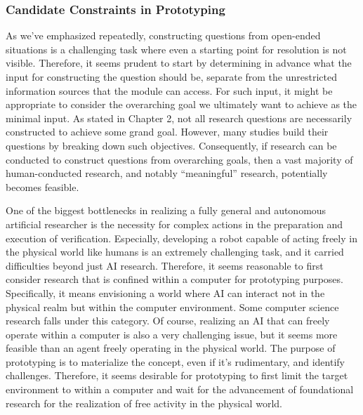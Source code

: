\subsubsection{Candidate Constraints in Prototyping}

As we've emphasized repeatedly, constructing questions from open-ended situations is a challenging task where even a starting point for resolution is not visible. Therefore, it seems prudent to start by determining in advance what the input for constructing the question should be, separate from the unrestricted information sources that the module can access. For such input, it might be appropriate to consider the overarching goal we ultimately want to achieve as the minimal input. As stated in Chapter 2, not all research questions are necessarily constructed to achieve some grand goal. However, many studies build their questions by breaking down such objectives. Consequently, if research can be conducted to construct questions from overarching goals, then a vast majority of human-conducted research, and notably ``meaningful'' research, potentially becomes feasible.

One of the biggest bottlenecks in realizing a fully general and autonomous artificial researcher is the necessity for complex actions in the preparation and execution of verification. Especially, developing a robot capable of acting freely in the physical world like humans is an extremely challenging task, and it carried difficulties beyond just AI research. Therefore, it seems reasonable to first consider research that is confined within a computer for prototyping purposes. Specifically, it means envisioning a world where AI can interact not in the physical realm but within the computer environment. Some computer science research falls under this category. Of course, realizing an AI that can freely operate within a computer is also a very challenging issue, but it seems more feasible than an agent freely operating in the physical world. The purpose of prototyping is to materialize the concept, even if it's rudimentary, and identify challenges. Therefore, it seems desirable for prototyping to first limit the target environment to within a computer and wait for the advancement of foundational research for the realization of free activity in the physical world.

